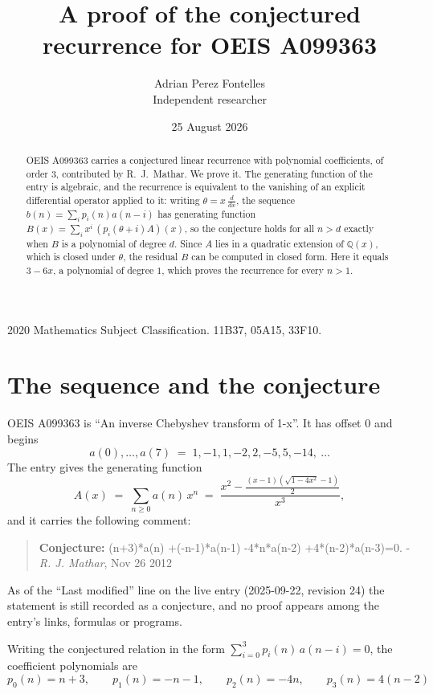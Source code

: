 \documentclass[11pt,a4paper]{article}
\title{A proof of the conjectured recurrence for OEIS A099363}
\author{Adrian Perez Fontelles\\ \small Independent researcher}
\date{25 August 2026}
\theoremstyle{plain}
\theoremstyle{definition}
\begin{document}
\maketitle

\begin{abstract}
OEIS A099363 carries a conjectured linear recurrence with polynomial coefficients, of
order 3, contributed by R.~J.~Mathar. We prove it. The generating function of the
entry is algebraic, and the recurrence is equivalent to the vanishing of an explicit
differential operator applied to it: writing $\theta=x\,\frac{d}{dx}$, the sequence
$b(n)=\sum_{i}p_{i}(n)a(n-i)$ has generating function
$B(x)=\sum_{i}x^{i}\,(p_{i}(\theta+i)A)(x)$, so the conjecture holds for all $n>d$ exactly
when $B$ is a polynomial of degree $d$. Since $A$ lies in a quadratic extension of
$\mathbb{Q}(x)$, which is closed under $\theta$, the residual $B$ can be computed in
closed form. Here it equals $3 - 6 x$, a polynomial of degree $1$, which proves
the recurrence for every $n>1$.
\end{abstract}

\noindent\small 2020 Mathematics Subject Classification. 11B37, 05A15, 33F10.\normalsize

\section{The sequence and the conjecture}

OEIS A099363 is ``An inverse Chebyshev transform of 1-x''. It has offset $0$ and begins
\[
a(0),\dots,a(7)\;=\;1, -1, 1, -2, 2, -5, 5, -14,\ \dots
\]
The entry gives the generating function
\begin{equation}\label{eq:gf}
A(x)\;=\;\sum_{n\ge 0} a(n)\,x^{n}\;=\;\frac{x^{2} - \frac{\left(x - 1\right) \left(\sqrt{1 - 4 x^{2}} - 1\right)}{2}}{x^{3}} ,
\end{equation}
and it carries the following comment:
\begin{quote}\small
\textbf{Conjecture:} (n+3)*a(n) +(-n-1)*a(n-1) -4*n*a(n-2) +4*(n-2)*a(n-3)=0. - \emph{R. J. Mathar}, Nov 26 2012
\end{quote}
As of the ``Last modified'' line on the live entry (2025-09-22, revision 24) the
statement is still recorded as a conjecture, and no proof appears among the entry's links,
formulas or programs.

Writing the conjectured relation in the form $\sum_{i=0}^{3}p_{i}(n)\,a(n-i)=0$,
the coefficient polynomials are
\[
p_{0}(n)=n + 3,\qquad p_{1}(n)=- n - 1,\qquad p_{2}(n)=- 4 n,\qquad p_{3}(n)=4 \left(n - 2\right)
\]
\end{document}
